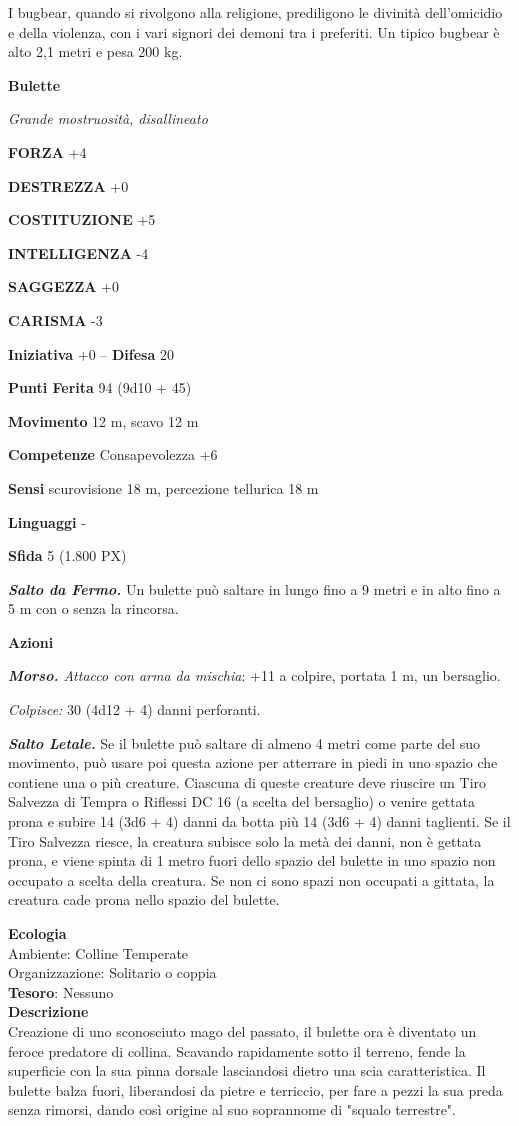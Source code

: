 \begin{multicols}{2}
I bugbear, quando si rivolgono alla religione, prediligono le divinità dell'omicidio e della violenza, con i vari signori dei demoni tra i preferiti. Un tipico bugbear è alto 2,1 metri e pesa 200 kg.

\medskip{}\textbf{Bulette}

\textit{Grande mostruosità, disallineato}

\textbf{FORZA} +4

\textbf{DESTREZZA} +0

\textbf{COSTITUZIONE} +5

\textbf{INTELLIGENZA} -4

\textbf{SAGGEZZA} +0

\textbf{CARISMA} -3

\textbf{Iniziativa} +0 -- \textbf{Difesa} 20

\textbf{Punti Ferita} 94 (9d10 + 45)

\textbf{Movimento} 12 m, scavo 12 m

\textbf{Competenze} Consapevolezza +6

\textbf{Sensi} scurovisione 18 m, percezione tellurica 18 m

\textbf{Linguaggi} -

\textbf{Sfida} 5 (1.800 PX)

\textit{\textbf{Salto da Fermo.}} Un bulette può saltare in lungo fino a 9 metri e in alto fino a 5 m con o senza la rincorsa.

\textbf{Azioni}

\textit{\textbf{Morso.} Attacco con arma da mischia}: +11 a colpire, portata 1 m, un bersaglio.

\textit{Colpisce:} 30 (4d12 + 4) danni perforanti.

\textit{\textbf{Salto Letale.}} Se il bulette può saltare di almeno 4 metri come parte del suo movimento, può usare poi questa azione per atterrare in piedi in uno spazio che contiene una o più creature. Ciascuna di queste creature deve riuscire un Tiro Salvezza di Tempra o Riflessi DC 16 (a scelta del bersaglio) o venire gettata prona e subire 14 (3d6 + 4) danni da botta più 14 (3d6 + 4) danni taglienti. Se il Tiro Salvezza riesce, la creatura subisce solo la metà dei danni, non è gettata prona, e viene spinta di 1 metro fuori dello spazio del bulette in uno spazio non occupato a scelta della creatura. Se non ci sono spazi non occupati a gittata, la creatura cade prona nello spazio del bulette.

\textbf{Ecologia}\\
Ambiente: Colline Temperate\\
Organizzazione: Solitario o coppia\\
\textbf{Tesoro}: Nessuno\\
\textbf{Descrizione}\\
Creazione di uno sconosciuto mago del passato, il bulette ora è diventato un feroce predatore di collina. Scavando rapidamente sotto il terreno, fende la superficie con la sua pinna dorsale lasciandosi dietro una scia caratteristica. Il bulette balza fuori, liberandosi da pietre e terriccio, per fare a pezzi la sua preda senza rimorsi, dando così origine al suo soprannome di "squalo terrestre".


\end{multicols}
